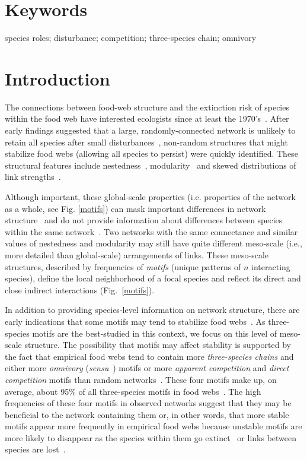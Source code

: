 \documentclass[12pt]{article}
\begin{document}
\begin{spacing}{2.0}
\section*{Keywords}

	species roles; disturbance; competition; three-species chain; omnivory

\clearpage
    
\section*{Introduction}

	The connections between food-web structure and the extinction risk of species within the food web have interested ecologists since at least the 1970's~\citep{May1972}. After early findings suggested that a large, randomly-connected network is unlikely to retain all species after small disturbances~\citep{Gardner1970,May1972}, non-random structures that might stabilize food webs (allowing all species to persist) were quickly identified. These structural features include nestedness~\citep{Allesina2012,Sauve2014}, modularity~\citep{Sauve2014,Thebault2010} and skewed distributions of link strengths~\citep{McCann1998,Gross2009,Rooney2012,Wootton2016}.
	
	
	Although important, these global-scale properties (i.e. properties of the network as a whole, see Fig. \ref{motifs}) can mask important differences in  network structure~\citep{Simmons2019} and do not provide information about differences between species within the same network~\citep{Cirtwill2018FoodWebs}. 
	Two networks with the same connectance and similar values of nestedness and modularity may still have quite different meso-scale (i.e., more detailed than global-scale) arrangements of links. 
	These meso-scale structures, described by frequencies of \emph{motifs} (unique patterns of $n$ interacting species), define the local neighborhood of a focal species and reflect its direct and close indirect interactions (Fig.~\ref{motifs}).
	

    In addition to providing species-level information on network structure, there are early indications that some motifs may tend to stabilize food webs~\citep{Prill2005,Borrelli2015,Monteiro2016}. 
    As three-species motifs are the best-studied in this context, we focus on this level of meso-scale structure.
    The possibility that motifs may affect stability  is supported by the fact that empirical food webs tend to contain more \emph{three-species chains} and either more \emph{omnivory} (\emph{sensu}~\citealp[]{Thompson2007b}) motifs or more \emph{apparent competition} and \emph{direct competition} motifs than random networks~\citep{Stouffer2007}. 
    These four motifs make up, on average, about 95\% of all three-species motifs in food webs~\citep{Stouffer2010b}. 
    The high frequencies of these four motifs in observed networks suggest that they may be beneficial to the network containing them or, in other words, that more stable motifs appear more frequently in empirical food webs because unstable motifs are more likely to disappear as the species within them go extinct~\citep{Borrelli2015,Borrelli2015a} or links between species are lost~\citep{Tylianakis2010}.


\end{spacing}
\end{document}
